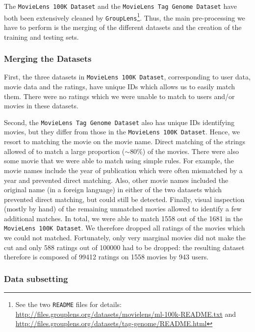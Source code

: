 \documentclass[bj, preprint]{imsart}
\begin{document}
The \texttt{MovieLens 100K Dataset} and the \texttt{MovieLens Tag Genome Dataset} have both been extensively cleaned by \texttt{GroupLens}\footnote{See the two \texttt{README} files for details: \url{http://files.grouplens.org/datasets/movielens/ml-100k-README.txt} and \url{http://files.grouplens.org/datasets/tag-genome/README.html}}. 
Thus, the main pre-processing we have to perform is the merging of the different datasets and the creation of the training and testing sets.

\subsubsection{Merging the Datasets}\label{subsubsec:method.preprocess.merge}

First, the three datasets in \texttt{MovieLens 100K Dataset}, corresponding to user data, movie data and the ratings, have unique IDs which allows us to easily match them. 
There were no ratings which we were unable to match to users and/or movies in these datasets.

Second, the \texttt{MovieLens Tag Genome Dataset} also has unique IDs identifying movies, but they differ from those in the \texttt{MovieLens 100K Dataset}. 
Hence, we resort to matching the movie on the movie name. 
Direct matching of the strings allowed of to match a large proportion ($\sim$80\%) of the movies. 
There were also some movie that we were able to match using simple rules. 
For example, the movie names include the year of publication which were often mismatched by a year and prevented direct matching. 
Also, other movie names included the original name (in a foreign language) in either of the two datasets which prevented direct matching, but could still be detected. 
Finally, visual inspection (mostly by hand) of the remaining unmatched movies allowed to identify a few additional matches.
In total, we were able to match \num{1558} out of the \num{1681} in the \texttt{MovieLens 100K Dataset}. 
We therefore dropped all ratings of the movies which we could not matched. Fortunately, only very marginal movies did not make the cut and only \num{588} ratings out of \num{100000} had to be dropped: the resulting dataset therefore is composed of \num{99412} ratings on \num{1558} movies by \num{943} users. 

\subsubsection{Data subsetting}\label{subsubsec:method.preprocess.subset}
\end{document}
